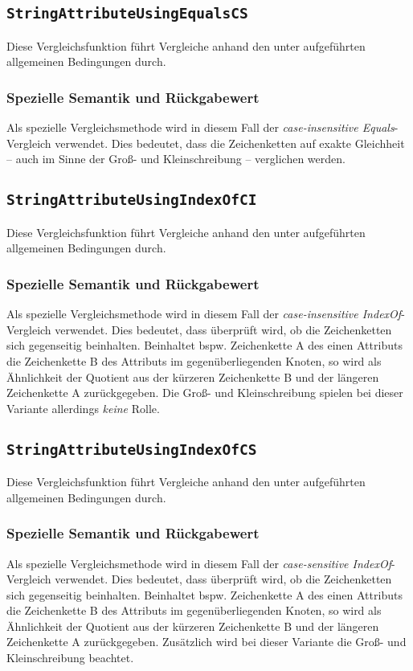 %
%
\subsection{\texttt{StringAttributeUsingEqualsCS}}
Diese Vergleichsfunktion führt Vergleiche anhand den unter  aufgeführten allgemeinen Bedingungen durch.

\subsubsection*{Spezielle Semantik und Rückgabewert}
Als spezielle Vergleichsmethode wird in diesem Fall der \emph{case-insensitive Equals}-Vergleich verwendet. Dies bedeutet, dass die Zeichenketten auf exakte Gleichheit -- auch im Sinne der Groß- und Kleinschreibung -- verglichen werden.


\newpage
%
%
\subsection{\texttt{StringAttributeUsingIndexOfCI}}
Diese Vergleichsfunktion führt Vergleiche anhand den unter  aufgeführten allgemeinen Bedingungen durch.

\subsubsection*{Spezielle Semantik und Rückgabewert}
Als spezielle Vergleichsmethode wird in diesem Fall der \emph{case-insensitive IndexOf}-Vergleich verwendet. Dies bedeutet, dass überprüft wird, ob die Zeichenketten sich gegenseitig beinhalten. Beinhaltet bspw. Zeichenkette A des einen Attributs die Zeichenkette B des Attributs im gegenüberliegenden Knoten, so wird als Ähnlichkeit der Quotient aus der kürzeren Zeichenkette B und der längeren Zeichenkette A zurückgegeben. Die Groß- und Kleinschreibung spielen bei dieser Variante allerdings \emph{keine} Rolle.


%
%
\subsection{\texttt{StringAttributeUsingIndexOfCS}}
Diese Vergleichsfunktion führt Vergleiche anhand den unter  aufgeführten allgemeinen Bedingungen durch.

\subsubsection*{Spezielle Semantik und Rückgabewert}
Als spezielle Vergleichsmethode wird in diesem Fall der \emph{case-sensitive IndexOf}-Vergleich verwendet. Dies bedeutet, dass überprüft wird, ob die Zeichenketten sich gegenseitig beinhalten. Beinhaltet bspw. Zeichenkette A des einen Attributs die Zeichenkette B des Attributs im gegenüberliegenden Knoten, so wird als Ähnlichkeit der Quotient aus der kürzeren Zeichenkette B und der längeren Zeichenkette A zurückgegeben. Zusätzlich wird bei dieser Variante die Groß- und Kleinschreibung beachtet.

